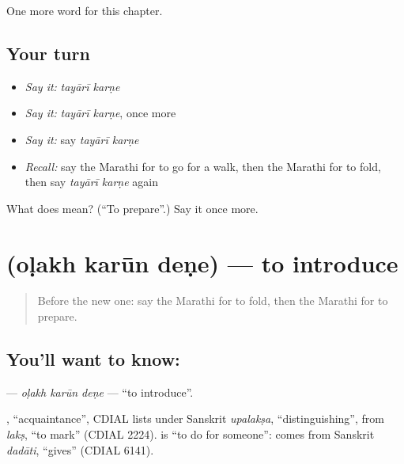 \begin{grammarlens}[title={What you've built}]
One more word for this chapter.
\end{grammarlens}

\subsection*{Your turn}
\begin{itemize}
\raggedright
  \item \emph{Say it:} \emph{tayārī karṇe}
  \item \emph{Say it:} \emph{tayārī karṇe}, once more
  \item \emph{Say it:} say \emph{tayārī karṇe}
  \item \emph{Recall:} say the Marathi for to go for a walk, then the Marathi for to fold, then say \emph{tayārī karṇe} again
\end{itemize}

\begin{tcolorbox}[breakable,colback=teal!4,colframe=teal!35!black,title={Before you move on}]
What does   mean? (\textquotedblleft{}To prepare\textquotedblright{}.) Say it once more.
\end{tcolorbox}
\section[\texorpdfstring{\mr{ओळख} \mr{करून} \mr{देणे} (oḷakh karūn deṇe)}{ओळख करून देणे (oḷakh karūn deṇe)}]{   (oḷakh karūn deṇe) — to introduce}

\label{lesson:MR-C196-olakh-karun-dene}



\begin{quote}
Before the new one: say the Marathi for to fold, then the Marathi for to prepare.
\end{quote}

\subsection*{You'll want to know:   }
\textbf{  } — \emph{oḷakh karūn deṇe} — \textquotedblleft{}to introduce\textquotedblright{}.

\begin{cousinweb}
\textbf{}, \textquotedblleft{}acquaintance\textquotedblright{}, CDIAL lists under Sanskrit \emph{upalakṣa}, \textquotedblleft{}distinguishing\textquotedblright{}, from \emph{lakṣ}, \textquotedblleft{}to mark\textquotedblright{} (CDIAL 2224). \textbf{ } is \textquotedblleft{}to do for someone\textquotedblright{}: \textbf{} comes from Sanskrit \emph{dadāti}, \textquotedblleft{}gives\textquotedblright{} (CDIAL 6141).
\end{cousinweb}

